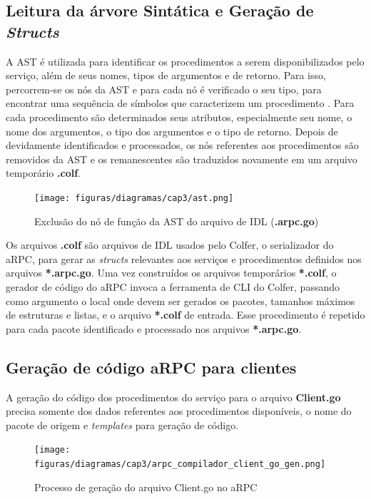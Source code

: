 \subsection{Leitura da árvore Sintática e Geração de \textit{Structs}}

A AST é utilizada para identificar os procedimentos a serem disponibilizados pelo serviço, além de seus nomes, tipos de argumentos e de retorno. Para isso, percorrem-se os nós da AST e para cada nó é verificado o seu tipo, para encontrar uma sequência de símbolos que caracterizem um procedimento \cite{zaytsev_parsing_2014}. Para cada procedimento são determinados seus atributos, especialmente seu nome, o nome dos argumentos, o tipo dos argumentos e o tipo de retorno. Depois de devidamente identificados e processados, os nós referentes aos procedimentos são removidos da AST e os remanescentes são traduzidos novamente em um arquivo temporário \textbf{.colf}.

\begin{figure}[ht]
    \centering
    \caption{Exclusão do nó de função da AST do arquivo de IDL (\textbf{.arpc.go})}
    \texttt{[image: figuras/diagramas/cap3/ast.png]}
    \label{fig:arpc_ast_function_removal}
\end{figure}

Os arquivos \textbf{.colf} são arquivos de IDL usados pelo Colfer, o serializador do aRPC, para gerar as \textit{structs} relevantes aos serviços e procedimentos definidos nos arquivos \textbf{*.arpc.go}. Uma vez construídos os arquivos temporários \textbf{*.colf}, o gerador de código do aRPC invoca a ferramenta de CLI do Colfer, passando como argumento o local onde devem ser gerados os pacotes, tamanhos máximos de estruturas e listas, e o arquivo \textbf{*.colf} de entrada. Esse procedimento é repetido para cada pacote identificado e processado nos arquivos \textbf{*.arpc.go}.

\subsection{Geração de código aRPC para clientes}

A geração do código dos procedimentos do serviço para o arquivo \textbf{Client.go} precisa somente dos dados referentes aos procedimentos disponíveis, o nome do pacote de origem e \textit{templates} para geração de código.

\begin{figure}[ht]
    \centering
    \caption{Processo de geração do arquivo Client.go no aRPC}
    \texttt{[image: figuras/diagramas/cap3/arpc\_compilador\_client\_go\_gen.png]}
    \label{fig:arpc_compiler_client_go_gen}
\end{figure}


